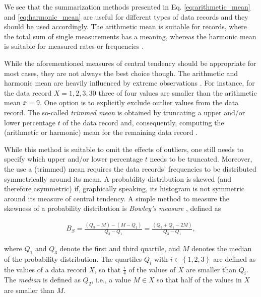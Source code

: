 We see that the summarization methods presented in Eq. \ref{eq:arithmetic_mean}
and \ref{eq:harmonic_mean} are useful for different types of data records and they should
be used accordingly. The arithmetic mean is suitable for records, where the total sum of single
measurements has a meaning, whereas the harmonic mean is suitable for measured
rates or frequencies \citep{smith_characterizing_1988}.

While the aforementioned measures of central tendency should be appropriate for
most cases, they are not always the best choice though. The arithmetic
and harmonic mean are heavily influenced by extreme observations
\citep{shanmugam_statistics_2015}. 
For instance, for the data record $X = 1, 2, 3, 30$ three of four values are smaller than the
arithmetic mean $\bar{x} = 9$. One option is to explicitly exclude outlier
values from the data record. The so-called \emph{trimmed mean} is
obtained by truncating a upper and/or lower percentage $t$ of the data record
and, consequently, computing the (arithmetic or harmonic) mean for the remaining
data record \citep{shanmugam_statistics_2015}. 

While this method is suitable to omit the effects of outliers, one still needs to specify
which upper and/or lower percentage $t$ needs to be truncated. Moreover, the use
a (trimmed) mean requires the data records' frequencies to be distributed
symmetrically around its mean.
A probability distribution is skewed (and therefore asymmetric) if, graphically speaking, its histogram is not
symmetric around its measure of central tendency. A simple method to measure the
skewness of a probability distribution is \emph{Bowley's measure}
\citep{shanmugam_statistics_2015}, defined as

\begin{equation} \label{eq:bowley}
\begin{split}
B_S = \frac{(Q_3 - M) - (M - Q_1)}{Q_3 - Q_1} = \frac{(Q_3 + Q_1 - 2M)}{Q_3
- Q_1},
\end{split}
\end{equation}

where $Q_1$ and $Q_3$ denote the first and third quartile, and $M$ denotes the
median of the probability distribution. The quartiles $Q_i$ with $i \in \left\{
1,2,3 \right\}$ are defined as the values of a data record $X$, so that
$\frac{i}{4}$ of the values of $X$ are smaller than $Q_i$. The \emph{median} is
defined as $Q_2$, i.e., a value $M \in X$ so that half of the values in $X$ are smaller than $M$.

